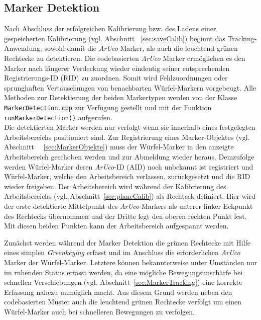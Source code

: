 \subsection{Marker Detektion}\label{sec:MarkerDetektion} 
Nach Abschluss der erfolgreichen Kalibrierung bzw. des Ladens einer gespeicherten Kalibrierung (vgl. Abschnitt ~\ref{sec:saveCalib}) beginnt das Tracking-Anwendung, sowohl damit die \textit{ArUco} Marker, als auch die leuchtend grünen Rechtecke zu detektieren. Die codebasierten \textit{ArUco} Marker ermöglichen es den Marker nach längerer Verdeckung wieder eindeutig seiner entsprechenden Registrierungs-ID (RID) zu zuordnen. Somit wird Fehlzuordnungen oder sprunghaften Vertauschungen von benachbarten Würfel-Markern vorgebeugt. Alle Methoden zur Detektierung der beiden Markertypen werden von der Klasse \texttt{Marker\-Detection.cpp} zur Verfügung gestellt und mit der Funktion \texttt{run\-Marker\-Detection()} aufgerufen. \\
Die detektierten Marker werden nur verfolgt wenn sie innerhalb eines festgelegten Arbeitsbereichs positioniert sind. Zur Registrierung eines Marker-Objektes (vgl. Abschnitt~ ~\ref{sec:MarkerObjekte}) muss der Würfel-Marker in den anzeigte Arbeitsbereich geschoben werden und zur Abmeldung wieder heraus. Demzufolge werden Würfel-Marker deren \textit{ArUco}-ID (AID) noch unbekannt ist registriert und Würfel-Marker, welche den Arbeitsbereich verlassen, zurückgesetzt und die RID wieder freigeben. Der Arbeitsbereich wird während der Kalibrierung des Arbeitsbereichs (vgl. Abschnitt~\ref{sec:planeCalib}) als Rechteck definiert. Hier wird der erste detektierte Mittelpunkt des \textit{ArUco}-Markers als unterer linker Eckpunkt des Rechtecks übernommen und der Dritte legt den oberen rechten Punkt fest. Mit diesen beiden Punkten kann der Arbeitsbereich aufgespannt werden. 

Zunächst werden während der Marker Detektion die grünen Rechtecke mit Hilfe eines simplen \textit{Greenkeying} erfasst und im Anschluss die erforderlichen \textit{ArUco} Marker der Würfel-Marker. Letztere können bekannterweise unter Umständen nur im ruhenden Status erfasst werden, da eine mögliche Bewegungsunschärfe bei schnellen Verschiebungen (vgl. Abschnitt~\ref{sec:MarkerTracking}) eine korrekte Erfassung nahezu unmöglich macht. 
Aus diesem Grund werden neben den codebasierten Muster auch die leuchtend grünen Rechtecke verfolgt um einen Würfel-Marker auch bei schnelleren Bewegungen zu verfolgen.
